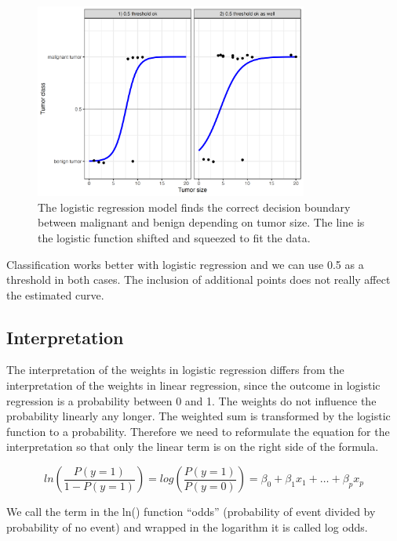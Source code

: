 \documentclass[
  11pt,
]{scrbook}
\begin{document}
\begin{figure}

{\centering \includegraphics[width=0.8\textwidth]{images/logistic-class-threshold-1} 

}

\caption{The logistic regression model finds the correct decision boundary between malignant and benign depending on tumor size. The line is the logistic function shifted and squeezed to fit the data.}\label{fig:logistic-class-threshold}
\end{figure}

Classification works better with logistic regression and we can use 0.5 as a threshold in both cases. The inclusion of additional points does not really affect the estimated curve.

\hypertarget{interpretation-1}{%
\subsection{Interpretation}\label{interpretation-1}}

The interpretation of the weights in logistic regression differs from the interpretation of the weights in linear regression, since the outcome in logistic regression is a probability between 0 and 1.
The weights do not influence the probability linearly any longer.
The weighted sum is transformed by the logistic function to a probability.
Therefore we need to reformulate the equation for the interpretation so that only the linear term is on the right side of the formula.

\[ln\left(\frac{P(y=1)}{1-P(y=1)}\right)=log\left(\frac{P(y=1)}{P(y=0)}\right)=\beta_{0}+\beta_{1}x_{1}+\ldots+\beta_{p}x_{p}\]

We call the term in the ln() function ``odds'' (probability of event divided by probability of no event) and wrapped in the logarithm it is called log odds.
\end{document}
